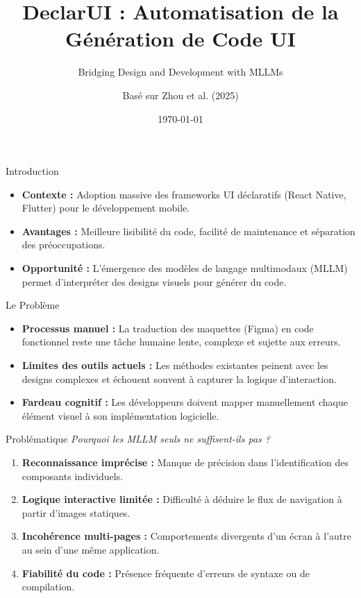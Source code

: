 \documentclass{beamer}
\title[DeclarUI]{DeclarUI : Automatisation de la Génération de Code UI}
\subtitle{Bridging Design and Development with MLLMs}
\author{Basé sur Zhou et al. (2025)}
\date{\today}
\begin{document}
\begin{frame}
    \titlepage
\end{frame}

\begin{frame}{Introduction}
    \begin{itemize}
        \item \textbf{Contexte :} Adoption massive des frameworks UI déclaratifs (React Native, Flutter) pour le développement mobile.
        \item \textbf{Avantages :} Meilleure lisibilité du code, facilité de maintenance et séparation des préoccupations.
        \item \textbf{Opportunité :} L'émergence des modèles de langage multimodaux (MLLM) permet d'interpréter des designs visuels pour générer du code.
    \end{itemize}
\end{frame}

\begin{frame}{Le Problème}
    \begin{itemize}
        \item \textbf{Processus manuel :} La traduction des maquettes (Figma) en code fonctionnel reste une tâche humaine lente, complexe et sujette aux erreurs.
        \item \textbf{Limites des outils actuels :} Les méthodes existantes peinent avec les designs complexes et échouent souvent à capturer la logique d'interaction.
        \item \textbf{Fardeau cognitif :} Les développeurs doivent mapper manuellement chaque élément visuel à son implémentation logicielle.
    \end{itemize}
\end{frame}

\begin{frame}{Problématique}
    \textit{Pourquoi les MLLM seuls ne suffisent-ils pas ?}
    \vspace{0.3cm}
    \begin{enumerate}
        \item \textbf{Reconnaissance imprécise :} Manque de précision dans l'identification des composants individuels.
        \item \textbf{Logique interactive limitée :} Difficulté à déduire le flux de navigation à partir d'images statiques.
        \item \textbf{Incohérence multi-pages :} Comportements divergents d'un écran à l'autre au sein d'une même application.
        \item \textbf{Fiabilité du code :} Présence fréquente d'erreurs de syntaxe ou de compilation.
    \end{enumerate}
\end{frame}
\end{document}
